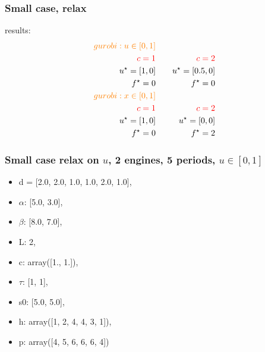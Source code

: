 \begin{frame}
  \frametitle{Small case, relax}
  results:
  \begin{align*}
    \textcolor{orange}{gurobi:  u \in [0, 1]    }          \\
    \textcolor{red}{c = 1} &       & \textcolor{red}{c =2} \\
    u^\star = [1, 0]       & \quad & u^\star = [0.5, 0]    \\
    f^\star = 0            &       & f^\star = 0           \\
    \textcolor{orange}{gurobi:    x \in [0, 1]      }      \\
    \textcolor{red}{c = 1} &       & \textcolor{red}{c =2} \\
    u^\star = [1, 0]       & \quad & u^\star = [0, 0]      \\
    f^\star = 0            &       & f^\star = 2           \\
  \end{align*}
\end{frame}

\begin{frame}
  \frametitle{Small case relax on \(u\), 2 engines, 5 periods,  \(u \in [0, 1]\)}
  \begin{itemize}
    \item d = [2.0, 2.0, 1.0, 1.0, 2.0, 1.0],
    \item \(\alpha\): [5.0, 3.0],
    \item \(\beta\): [8.0, 7.0],
    \item L: 2,
    \item c: array([1., 1.]),
    \item \(\tau\): [1, 1],
    \item s0: [5.0, 5.0],
    \item h: array([1, 2, 4, 4, 3, 1]),
    \item p: array([4, 5, 6, 6, 6, 4])
  \end{itemize}
\end{frame}


